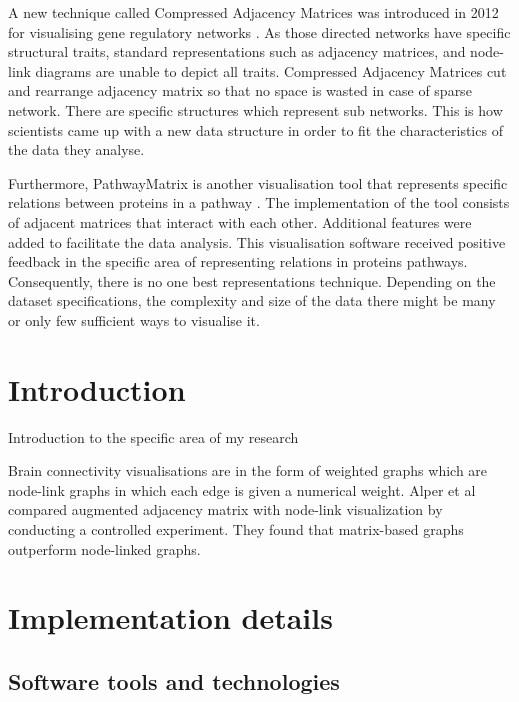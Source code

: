 \documentclass{l4proj}
\begin{document}
A new technique called Compressed Adjacency Matrices was introduced in 2012 for visualising gene regulatory networks \cite{dinkla2012compressed}. As those directed networks have specific structural traits, standard representations such as adjacency matrices, and node-link diagrams are unable to depict all traits. Compressed Adjacency Matrices cut and rearrange adjacency matrix so that no space is wasted in case of sparse network. There are specific structures which represent sub networks. This is how scientists came up with a new data structure in order to fit the characteristics of the data they analyse.

Furthermore, PathwayMatrix is another visualisation tool that represents specific relations between proteins in a pathway \cite{dang2015pathwaymatrix}. The implementation of the tool consists of adjacent matrices that interact with each other. Additional features were added to facilitate the data analysis. This visualisation software received positive feedback in the specific area of representing relations in proteins pathways. Consequently, there is no one best representations technique. Depending on the dataset specifications, the complexity and size of the data there might be many or only few sufficient ways to visualise it.       

\chapter{Introduction}
Introduction to the specific area of my research


Brain connectivity visualisations are in the form of weighted graphs which are node-link graphs in which each edge is given a numerical weight. Alper et al \cite{alper2013weighted} compared augmented adjacency matrix with node-link visualization by conducting a controlled experiment. They found that matrix-based graphs outperform node-linked graphs. 

\chapter{Implementation details}

\section{Software tools and technologies}
\end{document}
